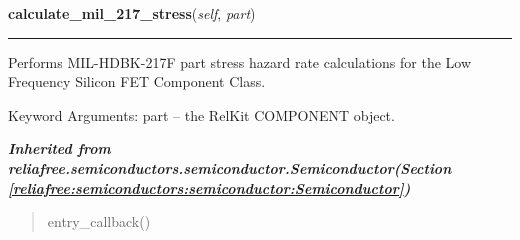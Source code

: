     \vspace{0.5ex}

\hspace{.8\funcindent}\begin{boxedminipage}{\funcwidth}

    \raggedright \textbf{calculate\_mil\_217\_stress}(\textit{self}, \textit{part})

    \vspace{-1.5ex}

    \rule{\textwidth}{0.5\fboxrule}
\setlength{\parskip}{2ex}
    Performs MIL-HDBK-217F part stress hazard rate calculations for the Low
    Frequency Silicon FET Component Class.

    Keyword Arguments: part -- the RelKit COMPONENT object.

\setlength{\parskip}{1ex}
    \end{boxedminipage}


\large{\textbf{\textit{Inherited from reliafree.semiconductors.semiconductor.Semiconductor\textit{(Section \ref{reliafree:semiconductors:semiconductor:Semiconductor})}}}}

\begin{quote}
entry\_callback()
\end{quote}
